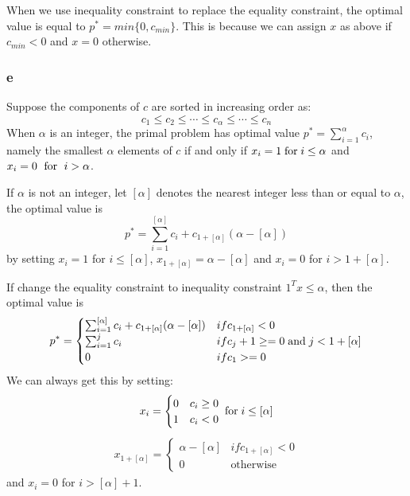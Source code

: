 \message{ !name(ass3_ChangLi.tex)}\documentclass[10pt,a4paper]{article}
\begin{document}
When we use inequality constraint to replace the equality
constraint, the optimal value is equal to
$p^*=min\{0,c_{min}\}$. This is because we can assign $x$ as
above if $c_{min}<0$ and $x=0$ otherwise.

\subsubsection{e}
Suppose the components of $c$ are sorted in increasing order
as:
$$
c_1\leq c_2\leq \dotsb \leq c_{\alpha} \leq \dotsb \leq c_n
$$
When $\alpha$ is an integer, the primal problem has optimal
value $p^*=\sum_{i=1}^\alpha c_i$, namely the smallest
$\alpha$ elements of $c$ if and only if $x_i=1
\text{\;for\;} i\leq \alpha$ and $x_i=0 \text{\; for \;}
i>\alpha$.

If $\alpha$ is not an integer, let $[\alpha]$ denotes the
nearest integer less than or equal to $\alpha$, the optimal value is
$$
p^*=\sum_{i=1}^{[\alpha]}c_i+c_{1+[\alpha]}(\alpha-[\alpha])
$$
by setting $x_i=1$ for $i\leq [\alpha]$, 
$x_{1+[\alpha]}=\alpha-[\alpha]$ and $x_i=0$ for $i>1+[\alpha]$.

If change the equality constraint to inequality constraint
$1^Tx\leq \alpha$, then the optimal value is 
\begin{align*}
  p^*=
  \begin{cases}
    \sum_{i=1}^{[\alpha]}c_i+c_{1+[\alpha]}(\alpha-[\alpha]) & if c_{1+[\alpha]} <0\\
    \sum_{i=1}^j c_i & if c_j+1\geq =0 \text{\;and\;} j<1+[\alpha]\\
    0 & if c_1>=0
  \end{cases}
\end{align*}
We can always get this by setting:
\begin{align*}
  x_i=
  \begin{cases}
    0 & c_i\geq0\\
    1 & c_i<0
  \end{cases}
\text{\;for\;} i\leq [\alpha]
\end{align*}
\begin{align*}
x_{1+[\alpha]}=
  \begin{cases}
    \alpha-[\alpha] & if c_{1+[\alpha]}<0\\
    0 &\text{otherwise}
  \end{cases}
\end{align*}
 and $x_i=0$ for $i>[\alpha]+1$.
\end{document}

